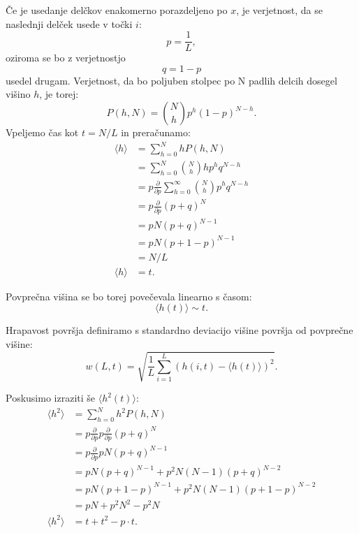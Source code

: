\documentclass[a4paper, twoside, 12pt]{book}
\begin{document}
Če je usedanje delčkov enakomerno porazdeljeno po $x$, je verjetnost, da se naslednji delček usede v točki $i$:
\begin{equation}
  p = \frac{1}{L},
\end{equation}
oziroma se bo z verjetnostjo
\begin{equation}
  q = 1 - p
\end{equation}
usedel drugam.
Verjetnost, da bo poljuben stolpec po N padlih delcih dosegel višino $h$, je torej:
\begin{equation}
  P(h,N) = \binom{N}{h} p^h (1 - p)^{N - h}.
\end{equation}
Vpeljemo čas kot $t = N / L$ in preračunamo:
\begin{align}
  \langle h \rangle &= \sum_{h=0}^{N} h P(h,N) \\
  &= \sum_{h=0}^{N} \binom{N}{h} h p^h q^{N - h} \\
  &= p \frac{\partial}{\partial p} \sum_{h=0}^{\infty} \binom{N}{h} p^h q^{N - h} \\
  &= p \frac{\partial}{\partial p} (p + q)^N \\
  &= p N (p + q)^{N-1} \\
  &= p N (p + 1 - p)^{N-1} \\
  &= N / L \\
  \langle h \rangle &= t.
\end{align}

Povprečna višina se bo torej povečevala linearno s časom:
\begin{equation}
  \langle h(t) \rangle \sim t.
\end{equation}

Hrapavost površja definiramo s standardno deviacijo višine površja od povprečne višine:
  \begin{equation}
    w(L,t) = \sqrt{\frac{1}{L} \sum_{i=1}^L (h(i,t)-\langle h(t) \rangle)^2}.
    \label{sirina-povrsine}
  \end{equation}

Poskusimo izraziti še $\langle h^2(t) \rangle $:
\begin{align}
  \langle h^2 \rangle &= \sum_{h=0}^{N} h^2 P(h,N) \\
  &= p \frac{\partial}{\partial p}p \frac{\partial}{\partial p} (p + q)^N \\
  &= p \frac{\partial}{\partial p} p N (p + q)^{N-1} \\
  &= p N (p + q)^{N-1} + p^2 N (N - 1) (p + q)^{N-2} \\
  &= p N (p + 1 - p)^{N-1} + p^2 N (N - 1) (p + 1 - p)^{N-2} \\
  &= p N + p^2 N^2 - p^2 N \\
  \langle h^2 \rangle &= t + t^2 - p \cdot t.
\end{align}
\end{document}
